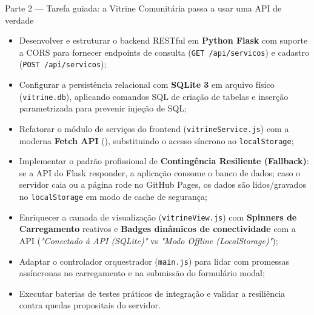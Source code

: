   {Parte 2 — Tarefa guiada: a Vitrine Comunitária passa a usar uma API de verdade}
  {\hspace{4pt}
   \hspace{4pt}
   }

\vspace{0.4em}

\begin{boxObjetivos}
\begin{itemize}
\item Desenvolver e estruturar o backend RESTful em \textbf{Python Flask} com suporte a CORS para fornecer endpoints de consulta (\texttt{GET /api/servicos}) e cadastro (\texttt{POST /api/servicos});
\item Configurar a persistência relacional com \textbf{SQLite 3} em arquivo físico (\texttt{vitrine.db}), aplicando comandos SQL de criação de tabelas e inserção parametrizada para prevenir injeção de SQL;
\item Refatorar o módulo de serviços do frontend (\texttt{vitrineService.js}) com a moderna \textbf{Fetch API} (), substituindo o acesso síncrono ao \texttt{localStorage};
\item Implementar o padrão profissional de \textbf{Contingência Resiliente (Fallback)}: se a API do Flask responder, a aplicação consome o banco de dados; caso o servidor caia ou a página rode no GitHub Pages, os dados são lidos/gravados no \texttt{localStorage} em modo de cache de segurança;
\item Enriquecer a camada de visualização (\texttt{vitrineView.js}) com \textbf{Spinners de Carregamento} reativos e \textbf{Badges dinâmicos de conectividade} com a API (\textit{"Conectado à API (SQLite)"} vs \textit{"Modo Offline (LocalStorage)"});
\item Adaptar o controlador orquestrador (\texttt{main.js}) para lidar com promessas assíncronas no carregamento e na submissão do formulário modal;
\item Executar baterias de testes práticos de integração e validar a resiliência contra quedas propositais do servidor.
\end{itemize}
\end{boxObjetivos}

